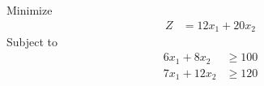 \documentclass[12pt]{article}
\begin{document}
\subsection{}
Minimize
\begin{align*}
Z              & = 12x_{1}+20x_{2}
\end{align*}
Subject to
\begin{align*}
6x_{1}+8x_{2}  & \ge 100                                                                                                                                                                                                                         \\
7x_{1}+12x_{2} & \ge 120                                                                                                                                                                                                                         \\
\end{align*}
\end{document}
